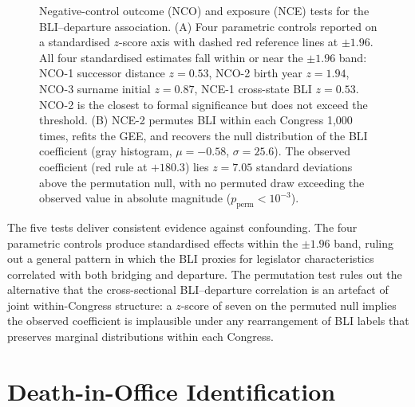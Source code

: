 \documentclass[12pt, a4paper]{article}
\begin{document}
\begin{figure}[H]
{\begin{tikzpicture}
\end{tikzpicture}
}
\caption{Negative-control outcome (NCO) and exposure (NCE) tests for the BLI--departure association. (A) Four parametric controls reported on a standardised $z$-score axis with dashed red reference lines at $\pm 1.96$. All four standardised estimates fall within or near the $\pm 1.96$ band: NCO-1 successor distance $z = 0.53$, NCO-2 birth year $z = 1.94$, NCO-3 surname initial $z = 0.87$, NCE-1 cross-state BLI $z = 0.53$. NCO-2 is the closest to formal significance but does not exceed the threshold. (B) NCE-2 permutes BLI within each Congress 1{,}000 times, refits the GEE, and recovers the null distribution of the BLI coefficient (gray histogram, $\mu = -0.58$, $\sigma = 25.6$). The observed coefficient (red rule at $+180.3$) lies $z = 7.05$ standard deviations above the permutation null, with no permuted draw exceeding the observed value in absolute magnitude ($p_{\mathrm{perm}} < 10^{-3}$).}
\label{fig:neg_controls}
\end{figure}

The five tests deliver consistent evidence against confounding. The four parametric controls produce standardised effects within the $\pm 1.96$ band, ruling out a general pattern in which the BLI proxies for legislator characteristics correlated with both bridging and departure. The permutation test rules out the alternative that the cross-sectional BLI--departure correlation is an artefact of joint within-Congress structure: a $z$-score of seven on the permuted null implies the observed coefficient is implausible under any rearrangement of BLI labels that preserves marginal distributions within each Congress.

\FloatBarrier
\section{Death-in-Office Identification}\label{sec:death_in_office}
\end{document}
